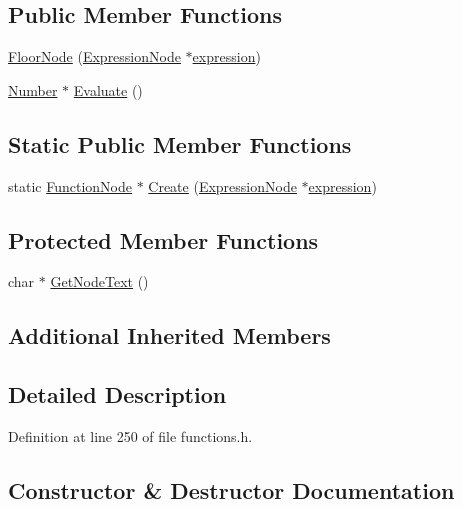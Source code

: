 \subsection*{Public Member Functions}
\begin{DoxyCompactItemize}
\item 
\hyperlink{classFloorNode_abb0ae020cc7c684e8caba32b15c7e44f}{Floor\+Node} (\hyperlink{classExpressionNode}{Expression\+Node} $\ast$\hyperlink{classFunctionNode_ad7577b179a1937aaf8a0058bb5b546dc}{expression})
\item 
\hyperlink{structNumber}{Number} $\ast$ \hyperlink{classFloorNode_a9c08ed22595cf33924eeb51160b30432}{Evaluate} ()
\end{DoxyCompactItemize}
\subsection*{Static Public Member Functions}
\begin{DoxyCompactItemize}
\item 
static \hyperlink{classFunctionNode}{Function\+Node} $\ast$ \hyperlink{classFloorNode_ad745c4e1c52cb8ad304d5ec5837e695a}{Create} (\hyperlink{classExpressionNode}{Expression\+Node} $\ast$\hyperlink{classFunctionNode_ad7577b179a1937aaf8a0058bb5b546dc}{expression})
\end{DoxyCompactItemize}
\subsection*{Protected Member Functions}
\begin{DoxyCompactItemize}
\item 
char $\ast$ \hyperlink{classFloorNode_ab585bdc9a3d3d53bae91b935be21d972}{Get\+Node\+Text} ()
\end{DoxyCompactItemize}
\subsection*{Additional Inherited Members}


\subsection{Detailed Description}


Definition at line 250 of file functions.\+h.



\subsection{Constructor \& Destructor Documentation}
